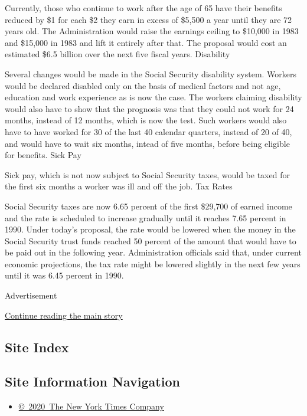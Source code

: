 Currently, those who continue to work after the age of 65 have their
benefits reduced by \$1 for each \$2 they earn in excess of \$5,500 a
year until they are 72 years old. The Administration would raise the
earnings ceiling to \$10,000 in 1983 and \$15,000 in 1983 and lift it
entirely after that. The proposal would cost an estimated \$6.5 billion
over the next five fiscal years. Disability

Several changes would be made in the Social Security disability system.
Workers would be declared disabled only on the basis of medical factors
and not age, education and work experience as is now the case. The
workers claiming disability would also have to show that the prognosis
was that they could not work for 24 months, instead of 12 months, which
is now the test. Such workers would also have to have worked for 30 of
the last 40 calendar quarters, instead of 20 of 40, and would have to
wait six months, intead of five months, before being eligible for
benefits. Sick Pay

Sick pay, which is not now subject to Social Security taxes, would be
taxed for the first six months a worker was ill and off the job. Tax
Rates

Social Security taxes are now 6.65 percent of the first \$29,700 of
earned income and the rate is scheduled to increase gradually until it
reaches 7.65 percent in 1990. Under today's proposal, the rate would be
lowered when the money in the Social Security trust funds reached 50
percent of the amount that would have to be paid out in the following
year. Administration officials said that, under current economic
projections, the tax rate might be lowered slightly in the next few
years until it was 6.45 percent in 1990.

Advertisement

\protect\hyperlink{after-bottom}{Continue reading the main story}

\hypertarget{site-index}{%
\subsection{Site Index}\label{site-index}}

\hypertarget{site-information-navigation}{%
\subsection{Site Information
Navigation}\label{site-information-navigation}}

\begin{itemize}
\tightlist
\item
  \href{https://help.nytimes3xbfgragh.onion/hc/en-us/articles/115014792127-Copyright-notice}{©~2020~The
  New York Times Company}
\end{itemize}

